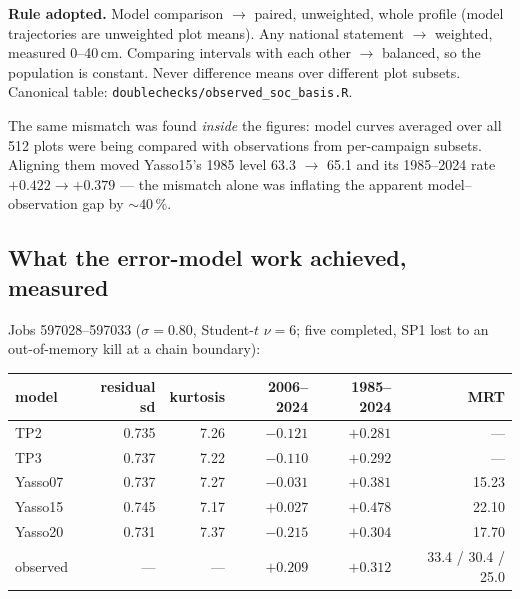 \documentclass[11pt]{article}
\begin{document}
\medskip
\noindent\textbf{Rule adopted.} Model comparison $\rightarrow$ paired, unweighted, whole profile
(model trajectories are unweighted plot means). Any national statement $\rightarrow$ weighted,
measured 0--40\,cm. Comparing intervals with each other $\rightarrow$ balanced, so the population is
constant. Never difference means over different plot subsets. Canonical table:
\texttt{doublechecks/observed\_soc\_basis.R}.

\medskip
\noindent The same mismatch was found \emph{inside} the figures: model curves averaged over all 512
plots were being compared with observations from per-campaign subsets. Aligning them moved
Yasso15's 1985 level 63.3 $\rightarrow$ 65.1 and its 1985--2024 rate $+0.422 \rightarrow +0.379$ ---
the mismatch alone was inflating the apparent model--observation gap by ${\sim}40\,\%$.

\subsection{What the error-model work achieved, measured}

Jobs 597028--597033 ($\sigma = 0.80$, Student-$t$ $\nu = 6$; five completed, SP1 lost to an
out-of-memory kill at a chain boundary):

\begin{center}\small
\begin{tabular}{lrrrrr}
\toprule
model & residual sd & kurtosis & 2006--2024 & 1985--2024 & MRT\\
\midrule
TP2 & 0.735 & 7.26 & $-0.121$ & $+0.281$ & ---\\
TP3 & 0.737 & 7.22 & $-0.110$ & $+0.292$ & ---\\
Yasso07 & 0.737 & 7.27 & $-0.031$ & $+0.381$ & 15.23\\
Yasso15 & 0.745 & 7.17 & $+0.027$ & $+0.478$ & 22.10\\
Yasso20 & 0.731 & 7.37 & $-0.215$ & $+0.304$ & 17.70\\
\midrule
observed & --- & --- & $+0.209$ & $+0.312$ & 33.4 / 30.4 / 25.0\\
\bottomrule
\end{tabular}
\end{center}
\end{document}
